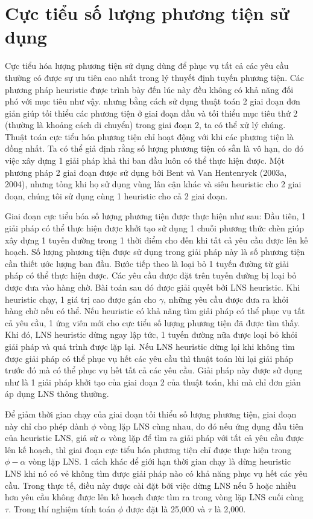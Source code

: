 \section{Cực tiểu số lượng phương tiện sử dụng}
Cực tiểu hóa lượng phương tiện sử dụng dùng để phục vụ tất cả các yêu cầu thường có được sự ưu tiên cao nhất trong lý thuyết định tuyến phương tiện. Các phương pháp heuristic được trình bày đến lúc này đều không có khả năng đối phó với mục tiêu như vậy. nhưng bằng cách sử dụng thuật toán 2 giai đoạn đơn giản giúp tối thiểu các phương tiện ở giai đoạn đầu và tối thiểu mục tiêu thứ 2 (thường là khoảng cách di chuyển) trong giai đoạn 2, ta có thể xử lý chúng. Thuật toán cực tiểu hóa phương tiện chỉ hoạt động với khi các phương tiện là đồng nhất. Ta có thể giả định rằng số lượng phương tiện có sẵn là vô hạn, do đó việc xây dựng 1 giải pháp khả thi ban đầu luôn có thể thực hiện được. Một phương pháp 2 giai đoạn được sử dụng bởi Bent và Van Hentenryck (2003a, 2004), nhưng tỏng khi họ sử dụng vùng lân cận khác và siêu heuristic cho 2 giai đoạn, chúng tôi sử dụng cùng 1 heuristic cho cả 2 giai đoạn.

Giai đoạn cực tiểu hóa số lượng phương tiện được thực hiện như sau: Đầu tiên, 1 giải pháp có thể thực hiện được khởi tạo sử dụng 1 chuỗi phương thức chèn giúp xây dựng 1 tuyến đường trong 1 thời điểm cho đến khi tất cả yêu cầu được lên kế hoạch. Số lượng phương tiện được sử dụng trong giải pháp này là số  phương tiện cần thiết ước lượng ban đầu. Bước tiếp theo là loại bỏ 1 tuyến đường từ giải pháp có thể thực hiện được. Các yêu cầu được đặt trên tuyến đường bị loại bỏ được đưa vào hàng chờ. Bài toán sau đó được giải quyết bởi LNS heuristic. Khi heuristic chạy, 1 giá trị cao được gán cho $\gamma$, những yêu cầu được đưa ra khỏi hàng chờ nếu có thể. Nếu heuristic có khả năng tìm giải pháp có thể phục vụ tất cả yêu cầu, 1 ứng viên mới cho cực tiểu số lượng phương tiện đã được tìm thấy. Khi đó, LNS heuristic dừng ngay lập tức, 1 tuyến đường nữa được loại bỏ khỏi giải pháp và quá trình được lặp lại. Nếu LNS heuristic dừng lại khi không tìm được giải pháp có thể phục vụ hết các yêu cầu thì thuật toán lùi lại giải pháp trước đó mà có thể phục vụ hết tất cả các yêu cầu. Giải pháp này được sử dụng như là 1 giải pháp khởi tạo của giai đoạn 2 của thuật toán, khi mà chỉ đơn giản áp dụng LNS thông thường.

Để giảm thời gian chạy của giai đoạn tối thiểu số lượng phương tiện, giai đoạn này chỉ cho phép dành $\phi$ vòng lặp LNS cùng nhau, do đó nếu ứng dụng đầu tiên của heuristic LNS, giả sử $\alpha$ vòng lặp để tìm ra giải pháp với tất cả yêu cầu được lên kế hoạch, thì giai đoạn cực tiểu hóa phương tiện chỉ được thực hiện trong $\phi - \alpha$ vòng lặp LNS. 1 cách khác để giới hạn thời gian chạy là dừng heuristic LNS khi nó có vẻ không tìm được giải pháp nào có khả năng phục vụ hết các yêu cầu. Trong thực tế, điều này được cài đặt bởi việc dừng LNS nếu 5 hoặc nhiều hơn yêu cầu không được lên kế hoạch được tìm ra trong vòng lặp LNS cuối cùng $\tau$. Trong thí nghiệm tính toán $\phi$ được đặt là 25,000 và $\tau$ là 2,000.
